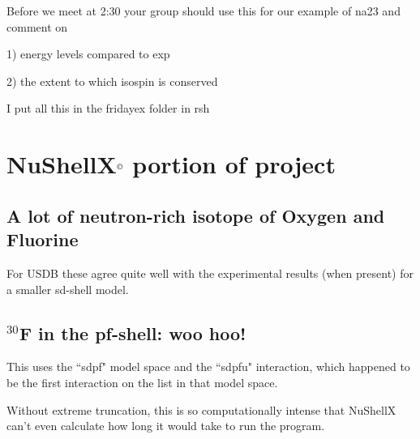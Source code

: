 \documentclass[12pt]{article}
\begin{document}
Before we meet at 2:30 your group should use this for our example of na23 and comment on

1) energy levels compared to exp

2) the extent to which isospin is conserved
    
    I put all this in the fridayex folder in rsh
    
\newpage




\section{NuShellX$^\copyright$ portion of project}



\subsection{A lot of neutron-rich isotope of Oxygen and Fluorine}

For USDB these agree quite well with the experimental results (when present) for a smaller sd-shell model. 



\subsection{$^{30}$F in the pf-shell: woo hoo!}

This uses the ``sdpf" model space and the ``sdpfu" interaction, which happened to be the first interaction on the list in that model space. 

Without extreme truncation, this is so computationally intense that NuShellX can't even calculate how long it would take to run the program. 

\newpage
 
\end{document}
